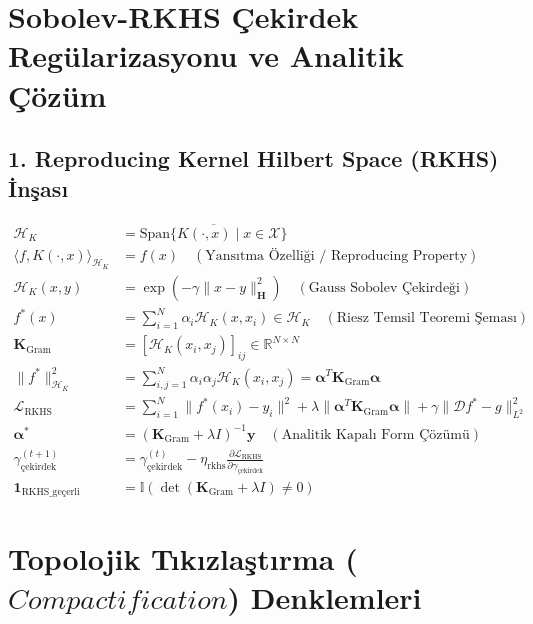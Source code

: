 \documentclass[11pt, a4paper]{article}
\begin{document}
\section{Sobolev-RKHS Çekirdek Regülarizasyonu ve Analitik Çözüm}

\subsection{1. Reproducing Kernel Hilbert Space (RKHS) İnşası}
\begin{align}
\mathcal{H}_K &= \overline{\text{Span}\{ K(\cdot, x) \mid x \in \mathcal{X} \}} \\
\langle f, K(\cdot, x) \rangle_{\mathcal{H}_K} &= f(x) \quad (\text{Yansıtma Özelliği / Reproducing Property}) \\
\mathcal{H}_K(x, y) &= \exp\left( -\gamma \|x - y\|_{\mathbf{H}}^2 \right) \quad (\text{Gauss Sobolev Çekirdeği}) \\
f^*(x) &= \sum_{i=1}^N \alpha_i \mathcal{H}_K(x, x_i) \in \mathcal{H}_K \quad (\text{Riesz Temsil Teoremi Şeması}) \\
\mathbf{K}_{\text{Gram}} &= \left[ \mathcal{H}_K(x_i, x_j) \right]_{ij} \in \mathbb{R}^{N \times N} \\
\|f^*\|_{\mathcal{H}_K}^2 &= \sum_{i,j=1}^N \alpha_i \alpha_j \mathcal{H}_K(x_i, x_j) = \bm{\alpha}^T \mathbf{K}_{\text{Gram}} \bm{\alpha} \\
\mathcal{L}_{\text{RKHS}} &= \sum_{i=1}^N \|f^*(x_i) - y_i\|^2 + \lambda \|\bm{\alpha}^T \mathbf{K}_{\text{Gram}} \bm{\alpha}\| + \gamma \|\mathcal{D} f^* - g\|_{L^2}^2 \\
\bm{\alpha}^* &= (\mathbf{K}_{\text{Gram}} + \lambda I)^{-1} \mathbf{y} \quad (\text{Analitik Kapalı Form Çözümü}) \\
\gamma_{\text{çekirdek}}^{(t+1)} &= \gamma_{\text{çekirdek}}^{(t)} - \eta_{\text{rkhs}} \frac{\partial \mathcal{L}_{\text{RKHS}}}{\partial \gamma_{\text{çekirdek}}} \\
\mathbf{1}_{\text{RKHS\_geçerli}} &= \mathbb{I}\left( \det(\mathbf{K}_{\text{Gram}} + \lambda I) \ne 0 \right)
\end{align}

\section{Topolojik Tıkızlaştırma ($Compactification$) Denklemleri}
\end{document}
